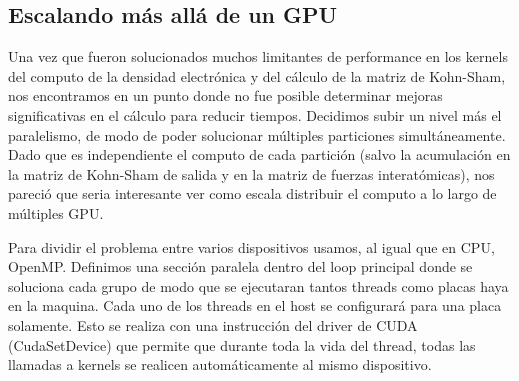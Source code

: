 %

\subsection{Escalando m\'as all\'a de un GPU}
Una vez que fueron solucionados muchos limitantes de performance en los kernels del computo
de la densidad electr\'onica y del c\'alculo de la matriz de Kohn-Sham, nos encontramos en un punto donde
no fue posible determinar mejoras significativas en el c\'alculo para reducir tiempos.
Decidimos subir un nivel m\'as el paralelismo, de modo de poder solucionar m\'ultiples particiones
simult\'aneamente. Dado que es independiente el computo de cada partici\'on (salvo la acumulaci\'on
en la matriz de Kohn-Sham de salida y en la matriz de fuerzas interat\'omicas), nos pareci\'o que seria
interesante ver como escala distribuir el computo a lo largo de m\'ultiples GPU.

Para dividir el problema entre varios dispositivos usamos, al igual que en CPU, OpenMP. Definimos
una secci\'on paralela dentro del loop principal donde se soluciona cada grupo de modo que se
ejecutaran tantos threads como placas haya en la maquina. Cada
uno de los threads en el host se configurar\'a para una placa solamente. Esto se realiza con
una instrucci\'on del driver de CUDA (CudaSetDevice) que permite que durante toda la vida del
thread, todas las llamadas a kernels se realicen autom\'aticamente al mismo dispositivo.

